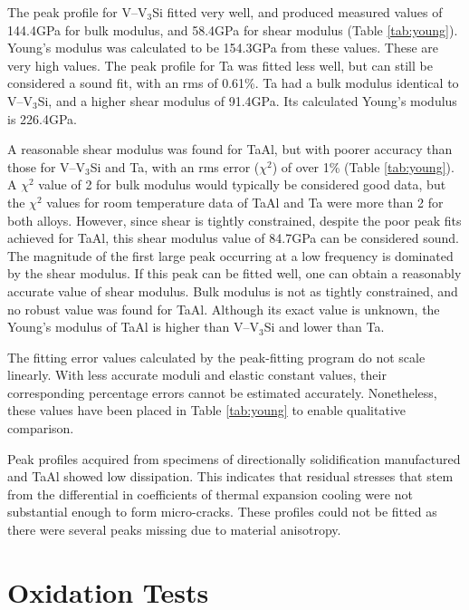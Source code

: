 The peak profile for V--V$_3$Si fitted very well, and produced measured values of 144.4GPa for bulk modulus, and 58.4GPa for shear modulus  (Table \ref{tab:young}).  Young's modulus was calculated to be 154.3GPa from these values.  These are very high values.  The peak profile for Ta was fitted less well, but can still be considered a sound fit, with an rms of 0.61\%.  Ta had a bulk modulus identical to V--V$_3$Si, and a higher shear modulus of 91.4GPa.  Its calculated Young's modulus is 226.4GPa.  

A reasonable shear modulus was found for TaAl, but with poorer accuracy than those for V--V$_3$Si and Ta, with an rms error ($\chi$$^2$) of over 1\% (Table \ref{tab:young}).  A $\chi$$^2$ value of 2 for bulk modulus would typically be considered good data, but the $\chi$$^2$ values for room temperature data of TaAl and Ta were more than 2 for both alloys.  However, since shear is tightly constrained, despite the poor peak fits achieved for TaAl, this shear modulus value of 84.7GPa can be considered sound.  The magnitude of the first large peak occurring at a low frequency is dominated by the shear modulus.  If this peak can be fitted well, one can obtain a reasonably accurate value of shear modulus.  Bulk modulus is not as tightly constrained, and no robust value was found for TaAl.  Although its exact value is unknown, the Young's modulus of TaAl is higher than V--V$_3$Si and lower than Ta.

The fitting error values calculated by the peak-fitting program do not scale linearly. With less accurate moduli and elastic constant values, their corresponding percentage errors cannot be estimated accurately.  Nonetheless, these values have been placed in Table \ref{tab:young} to enable qualitative comparison.

Peak profiles acquired from specimens of directionally solidification manufactured  and TaAl showed low dissipation.  This indicates that residual stresses that stem from the differential in coefficients of thermal expansion cooling were not substantial enough to form micro-cracks.  These profiles could not be fitted as there were several peaks missing due to material anisotropy.


\section{Oxidation Tests}


